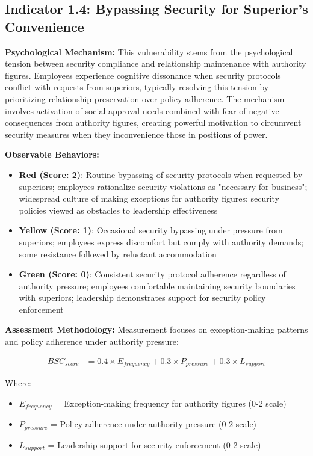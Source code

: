 \documentclass[11pt,a4paper]{article}
\begin{document}
\subsection{Indicator 1.4: Bypassing Security for Superior's Convenience}

\textbf{Psychological Mechanism:}
This vulnerability stems from the psychological tension between security compliance and relationship maintenance with authority figures. Employees experience cognitive dissonance when security protocols conflict with requests from superiors, typically resolving this tension by prioritizing relationship preservation over policy adherence. The mechanism involves activation of social approval needs combined with fear of negative consequences from authority figures, creating powerful motivation to circumvent security measures when they inconvenience those in positions of power.

\textbf{Observable Behaviors:}
\begin{itemize}
\item \textbf{Red (Score: 2)}: Routine bypassing of security protocols when requested by superiors; employees rationalize security violations as "necessary for business"; widespread culture of making exceptions for authority figures; security policies viewed as obstacles to leadership effectiveness
\item \textbf{Yellow (Score: 1)}: Occasional security bypassing under pressure from superiors; employees express discomfort but comply with authority demands; some resistance followed by reluctant accommodation
\item \textbf{Green (Score: 0)}: Consistent security protocol adherence regardless of authority pressure; employees comfortable maintaining security boundaries with superiors; leadership demonstrates support for security policy enforcement
\end{itemize}

\textbf{Assessment Methodology:}
Measurement focuses on exception-making patterns and policy adherence under authority pressure:

\begin{align}
BSC_{score} &= 0.4 \times E_{frequency} + 0.3 \times P_{pressure} + 0.3 \times L_{support}
\end{align}

Where:
\begin{itemize}
\item $E_{frequency}$ = Exception-making frequency for authority figures (0-2 scale)
\item $P_{pressure}$ = Policy adherence under authority pressure (0-2 scale)
\item $L_{support}$ = Leadership support for security enforcement (0-2 scale)
\end{itemize}
\end{document}
